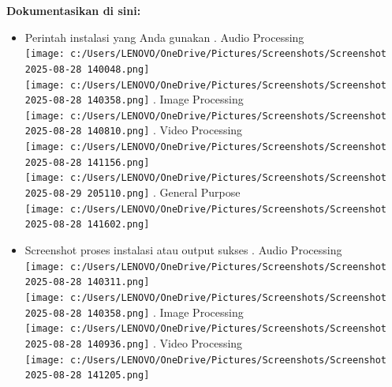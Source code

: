 \documentclass[11pt,a4paper]{article}
\begin{document}
\textbf{Dokumentasikan di sini:}
\begin{itemize}
    \item Perintah instalasi yang Anda gunakan
    . Audio Processing \\
    \noindent
    \hspace{1cm}\texttt{[image: c:/Users/LENOVO/OneDrive/Pictures/Screenshots/Screenshot 2025-08-28 140048.png]} \\
    \noindent
    \hspace{1cm}\texttt{[image: c:/Users/LENOVO/OneDrive/Pictures/Screenshots/Screenshot 2025-08-28 140358.png]}
    . Image Processing \\
    \noindent
    \hspace{1cm}\texttt{[image: c:/Users/LENOVO/OneDrive/Pictures/Screenshots/Screenshot 2025-08-28 140810.png]}
    . Video Processing \\
    \noindent
    \hspace{1cm}\texttt{[image: c:/Users/LENOVO/OneDrive/Pictures/Screenshots/Screenshot 2025-08-28 141156.png]} \\
    \noindent
    \hspace{1cm}\texttt{[image: c:/Users/LENOVO/OneDrive/Pictures/Screenshots/Screenshot 2025-08-29 205110.png]}
    . General Purpose \\
    \noindent
    \hspace{1cm}\texttt{[image: c:/Users/LENOVO/OneDrive/Pictures/Screenshots/Screenshot 2025-08-28 141602.png]}
    \item Screenshot proses instalasi atau output sukses
    . Audio Processing \\
    \noindent
    \hspace{1cm}\texttt{[image: c:/Users/LENOVO/OneDrive/Pictures/Screenshots/Screenshot 2025-08-28 140311.png]} \\
    \noindent
    \hspace{1cm}\texttt{[image: c:/Users/LENOVO/OneDrive/Pictures/Screenshots/Screenshot 2025-08-28 140358.png]}
    . Image Processing \\
    \noindent
    \hspace{1cm}\texttt{[image: c:/Users/LENOVO/OneDrive/Pictures/Screenshots/Screenshot 2025-08-28 140936.png]}  
    . Video Processing \\
    \noindent
    \hspace{1cm}\texttt{[image: c:/Users/LENOVO/OneDrive/Pictures/Screenshots/Screenshot 2025-08-28 141205.png]} \\

\end{itemize}
\end{document}

